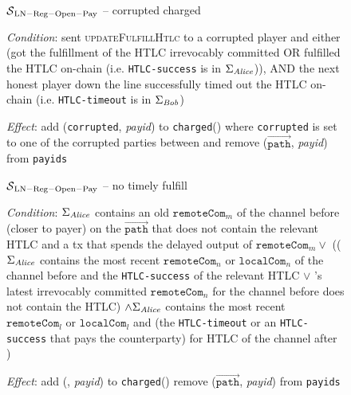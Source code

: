 \begin{figure}[H]
  \begin{simulatorbox}{$\mathcal{S}{}_{\mathrm{LN - Reg - Open - Pay}}$ --
  corrupted charged}
    \begin{algorithmic}[1]
      \Statex \textit{Condition}:
      \Indent
        \State \alice{} sent \textsc{updateFulfillHtlc} to a corrupted player
        and either (got the fulfillment of the HTLC irrevocably committed OR
        fulfilled the HTLC on-chain (i.e. \texttt{HTLC-success} is in
        $\Sigma_{\mathit{Alice}}$)), AND the next honest player \bob{} down the line
        successfully timed out the HTLC on-chain (i.e. \texttt{HTLC-timeout} is
        in $\Sigma_{\mathit{Bob}}$)
      \EndIndent
      \Statex

      \Statex \textit{Effect}:
      \Indent
         \State add (\texttt{corrupted}, \textit{payid}) to
         \texttt{charged}(\alice) where \texttt{corrupted} is set to one of the
         corrupted parties between \alice{} and \bob{}
         \State remove ($\overrightarrow{\mathtt{path}}$, \textit{payid}) from
         \texttt{payids}
      \EndIndent
    \end{algorithmic}
  \end{simulatorbox}
  \caption{}
  \label{alg:sim:resolvepay:corrupted:fig}
\end{figure}

\begin{figure}[H]
  \begin{simulatorbox}{$\mathcal{S}{}_{\mathrm{LN - Reg - Open - Pay}}$ -- no
  timely fulfill}
    \begin{algorithmic}[1]
      \Statex \textit{Condition}:
      \Indent
        \State $\Sigma_{\mathit{Alice}}$ contains an old $\mathtt{remoteCom}_m$ of the
        channel before \alice{} (closer to payer) on the
        $\overrightarrow{\mathtt{path}}$ that does not contain the relevant HTLC
        and a tx that spends the delayed output of $\mathtt{remoteCom}_m \vee$
        (($\Sigma_{\mathit{Alice}}$ contains the most recent $\mathtt{remoteCom}_n$ or
        $\mathtt{localCom}_n$ of the channel before \alice{} and the
        \texttt{HTLC-success} of the relevant HTLC $\vee$ \alice's latest
        irrevocably committed $\mathtt{remoteCom}_n$ for the channel before
        \alice{} does not contain the HTLC) $\wedge \Sigma_{\mathit{Alice}}$ contains
        the most recent $\mathtt{remoteCom}_l$ or $\mathtt{localCom}_l$ and (the
        \texttt{HTLC-timeout} or an \texttt{HTLC-success} that pays the
        counterparty) for HTLC of the channel after \alice{})
      \EndIndent
      \Statex

      \Statex \textit{Effect}:
      \Indent
         \State add (\alice, \textit{payid}) to \texttt{charged}(\alice)
         \State remove ($\overrightarrow{\mathtt{path}}$, \textit{payid}) from
         \texttt{payids}
      \EndIndent
    \end{algorithmic}
  \end{simulatorbox}
  \caption{}
  \label{alg:sim:resolvepay:nofulfill}
\end{figure}

